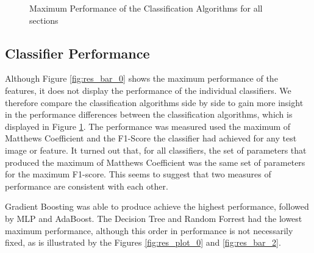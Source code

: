 \begin{figure}[]
	\caption{Maximum Performance of the Classification Algorithms for all sections}
	\label{fig:res_bar_1}
\end{figure}

\subsection{Classifier Performance}

Although Figure \ref{fig:res_bar_0} shows the maximum performance of the features, it does not display the performance of the individual classifiers. We therefore compare the classification algorithms side by side to gain more insight in the performance differences between the classification algorithms, which is displayed in Figure \ref{fig:res_bar_1}. The performance was measured used the maximum of Matthews Coefficient and the F1-Score the classifier had achieved for any test image or feature. It turned out that, for all classifiers, the set of parameters that produced the maximum of Matthews Coefficient was the same set of parameters for the maximum F1-score. This seems to suggest that two measures of performance are consistent with each other.

Gradient Boosting was able to produce achieve the highest performance, followed by MLP and AdaBoost. The Decision Tree and Random Forrest had the lowest maximum performance, although this order in performance is not necessarily fixed, as is illustrated by the Figures \ref{fig:res_plot_0} and \ref{fig:res_bar_2}.

